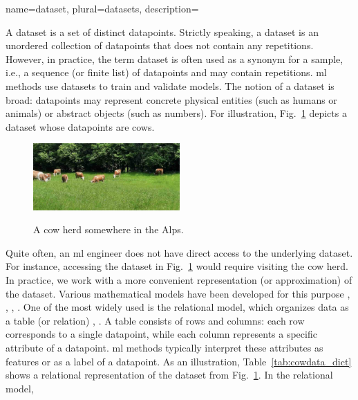 {name={dataset}, plural={datasets},
	description={A dataset is a set of distinct \glspl{datapoint}. 
	Strictly speaking, a dataset is an unordered collection of \glspl{datapoint} 
	that does not contain any repetitions. However, in practice, the term dataset 
    is often used as a synonym for a \gls{sample}, i.e., a sequence (or finite list) 
	of \glspl{datapoint} and may contain repetitions. 
	\gls{ml} methods use datasets to train and validate \glspl{model}. 
	The notion of a dataset is broad: \glspl{datapoint} may represent concrete 
	physical entities (such as humans or animals) or abstract objects (such as numbers). 
	For illustration, Fig.~\ref{fig_cows_dataset_dict} depicts a dataset whose 
	\glspl{datapoint} are cows.	
		\begin{figure}[H]
			\begin{center}
			\label{fig:cowsintheswissalps_dict}
			\includegraphics[width=0.5\textwidth]{assets/CowsAustria.jpg}
		  	\end{center}
			\caption{\label{fig_cows_dataset_dict}A cow herd somewhere in the Alps.}
	 	\end{figure}
		Quite often, an \gls{ml} engineer does not have direct access to the underlying dataset. 
		For instance, accessing the dataset in Fig.~\ref{fig_cows_dataset_dict} would require 
		visiting the cow herd. In practice, we work with a more convenient 
		representation (or approximation) of the dataset. Various mathematical \glspl{model} 
		have been developed for this purpose \cite{silberschatz2019database}, \cite{abiteboul1995foundations}, 
		\cite{hoberman2009data}, \cite{ramakrishnan2002database}. One of the most widely used is 
		the relational \gls{model}, which organizes \gls{data} as a table (or relation) 
		\cite{codd1970relational}, \cite{silberschatz2019database}. A table consists of 
		rows and columns: each row corresponds to a single \gls{datapoint}, while each 
		column represents a specific attribute of a \gls{datapoint}. 
		\gls{ml} methods typically interpret these attributes as \glspl{feature} 
		or as a \gls{label} of a \gls{datapoint}. As an illustration, 
		Table~\ref{tab:cowdata_dict} shows a relational representation of the 
		dataset from Fig.~\ref{fig_cows_dataset_dict}. In the relational \gls{model}, 
}}
